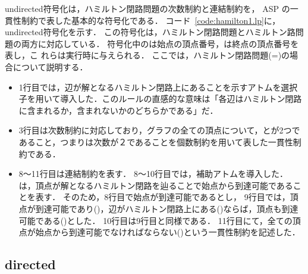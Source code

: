 % 



\textsf{undirected}符号化は，ハミルトン閉路問題の次数制約と連結制約を，
ASP の一貫性制約で表した基本的な符号化である．
コード~\ref{code:hamilton1.lp}に，\textsf{undirected}符号化を示す．
この符号化は，ハミルトン閉路問題とハミルトン路問題の両方に対応している．
符号化中のは始点の頂点番号，は終点の頂点番号を表し，こ
れらは実行時に与えられる．
ここでは，ハミルトン閉路問題(=)の場合について説明する．

\begin{itemize}
\item 1行目では，辺が解となるハミルトン閉路上にあることを示すアトムを選択子を用いて導入した．このルールの直感的な意味は「各辺はハミルトン閉路に含まれるか，含まれないかのどちらかである」だ．
\item 3行目は次数制約に対応しており，グラフの全ての頂点について，とが2つであること，つまりは次数が２であることを個数制約を用いて表した一貫性制約である．
\item 8〜11行目は連結制約を表す．
  8〜10行目では，補助アトムを導入した．
  は，頂点が解となるハミルトン閉路を辿ることで始点から到達可能であることを表す．
  そのため，8行目で始点が到達可能であるとし，
  9行目では，頂点が到達可能であり()，辺がハミルトン閉路上にある()ならば，頂点も到達可能である()とした．
  10行目は9行目と同様である．
  11行目にて，全ての頂点が始点から到達可能でなければならない()という一貫性制約を記述した．
\end{itemize}

\subsection{directed}

